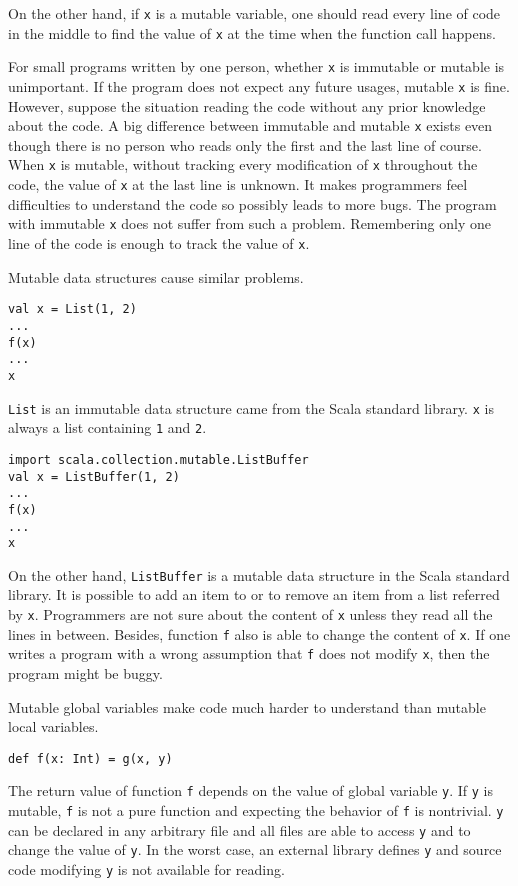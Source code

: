 On the other hand, if \verb!x! is a mutable variable, one should read every line
of code in the middle to find the value of \verb!x! at the time when the function
call happens.

For small programs written by one person, whether \verb!x! is immutable or
mutable is unimportant. If the program does not expect any future usages, mutable
\verb!x! is fine. However, suppose the situation reading the code without any
prior knowledge about the code. A big difference between immutable and mutable
\verb!x! exists even though there is no person who reads only the first and the
last line of course. When \verb!x! is mutable, without tracking every
modification of \verb!x! throughout the code, the value of \verb!x! at the last
line is unknown. It makes programmers feel difficulties to understand the code so
possibly leads to more bugs. The program with immutable \verb!x! does not suffer
from such a problem. Remembering only one line of the code is enough to track the
value of \verb!x!.

Mutable data structures cause similar problems.

\begin{verbatim}
val x = List(1, 2)
...
f(x)
...
x
\end{verbatim}

\verb!List! is an immutable data structure came from the Scala standard library.
\verb!x! is always a list containing \verb!1! and \verb!2!.

\begin{verbatim}
import scala.collection.mutable.ListBuffer
val x = ListBuffer(1, 2)
...
f(x)
...
x
\end{verbatim}

On the other hand, \verb!ListBuffer! is a mutable data structure in the Scala
standard library. It is possible to add an item to or to remove an item from a
list referred by \verb!x!. Programmers are not sure about the content of \verb!x!
unless they read all the lines in between. Besides, function \verb!f! also is
able to change the content of \verb!x!. If one writes a program with a wrong
assumption that \verb!f! does not modify \verb!x!, then the program might be
buggy.

Mutable global variables make code much harder to understand than mutable local
variables.

\begin{verbatim}
def f(x: Int) = g(x, y)
\end{verbatim}

The return value of function \verb!f! depends on the value of global variable
\verb!y!. If \verb!y! is mutable, \verb!f! is not a pure function and expecting
the behavior of \verb!f! is nontrivial. \verb!y! can be declared in any arbitrary
file and all files are able to access \verb!y! and to change the value of
\verb!y!. In the worst case, an external library defines \verb!y! and source code
modifying \verb!y! is not available for reading.

